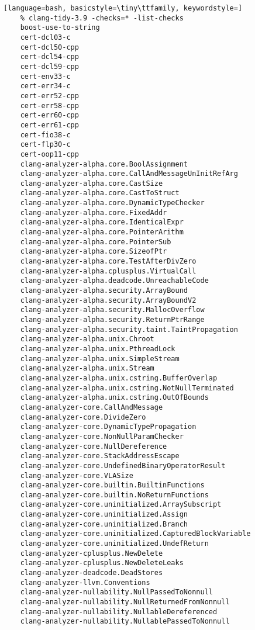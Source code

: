 \documentclass[aspectratio=169]{beamer}
\begin{document}
\begin{lstlisting}[language=bash, basicstyle=\tiny\ttfamily, keywordstyle=]
    % clang-tidy-3.9 -checks=* -list-checks
    boost-use-to-string
    cert-dcl03-c
    cert-dcl50-cpp
    cert-dcl54-cpp
    cert-dcl59-cpp
    cert-env33-c
    cert-err34-c
    cert-err52-cpp
    cert-err58-cpp
    cert-err60-cpp
    cert-err61-cpp
    cert-fio38-c
    cert-flp30-c
    cert-oop11-cpp
    clang-analyzer-alpha.core.BoolAssignment
    clang-analyzer-alpha.core.CallAndMessageUnInitRefArg
    clang-analyzer-alpha.core.CastSize
    clang-analyzer-alpha.core.CastToStruct
    clang-analyzer-alpha.core.DynamicTypeChecker
    clang-analyzer-alpha.core.FixedAddr
    clang-analyzer-alpha.core.IdenticalExpr
    clang-analyzer-alpha.core.PointerArithm
    clang-analyzer-alpha.core.PointerSub
    clang-analyzer-alpha.core.SizeofPtr
    clang-analyzer-alpha.core.TestAfterDivZero
    clang-analyzer-alpha.cplusplus.VirtualCall
    clang-analyzer-alpha.deadcode.UnreachableCode
    clang-analyzer-alpha.security.ArrayBound
    clang-analyzer-alpha.security.ArrayBoundV2
    clang-analyzer-alpha.security.MallocOverflow
    clang-analyzer-alpha.security.ReturnPtrRange
    clang-analyzer-alpha.security.taint.TaintPropagation
    clang-analyzer-alpha.unix.Chroot
    clang-analyzer-alpha.unix.PthreadLock
    clang-analyzer-alpha.unix.SimpleStream
    clang-analyzer-alpha.unix.Stream
    clang-analyzer-alpha.unix.cstring.BufferOverlap
    clang-analyzer-alpha.unix.cstring.NotNullTerminated
    clang-analyzer-alpha.unix.cstring.OutOfBounds
    clang-analyzer-core.CallAndMessage
    clang-analyzer-core.DivideZero
    clang-analyzer-core.DynamicTypePropagation
    clang-analyzer-core.NonNullParamChecker
    clang-analyzer-core.NullDereference
    clang-analyzer-core.StackAddressEscape
    clang-analyzer-core.UndefinedBinaryOperatorResult
    clang-analyzer-core.VLASize
    clang-analyzer-core.builtin.BuiltinFunctions
    clang-analyzer-core.builtin.NoReturnFunctions
    clang-analyzer-core.uninitialized.ArraySubscript
    clang-analyzer-core.uninitialized.Assign
    clang-analyzer-core.uninitialized.Branch
    clang-analyzer-core.uninitialized.CapturedBlockVariable
    clang-analyzer-core.uninitialized.UndefReturn
    clang-analyzer-cplusplus.NewDelete
    clang-analyzer-cplusplus.NewDeleteLeaks
    clang-analyzer-deadcode.DeadStores
    clang-analyzer-llvm.Conventions
    clang-analyzer-nullability.NullPassedToNonnull
    clang-analyzer-nullability.NullReturnedFromNonnull
    clang-analyzer-nullability.NullableDereferenced
    clang-analyzer-nullability.NullablePassedToNonnull

\end{lstlisting}
\end{document}
